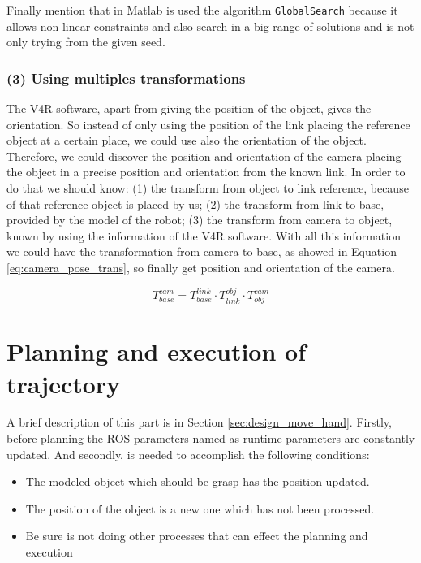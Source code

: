 \documentclass[12pt,a4paper,final,twoside,openright]{report}
\begin{document}
Finally mention that in Matlab is used the algorithm \texttt{GlobalSearch} because it allows non-linear constraints and also search in a big range of solutions and is not only trying from the given seed. 

\vspace{-10pt}
\subsubsection{(3) Using multiples transformations}

The V4R software, apart from giving the position of the object, gives the orientation. So instead of only using the position of the link placing the reference object at a certain place, we could use also the orientation of the object. Therefore, we could discover the position and orientation of the camera placing the object in a precise position and orientation from the known link. In order to do that we should know: (1) the transform from object to link reference, because of that reference object is placed by us; (2) the transform from link to base, provided by the model of the robot; (3) the transform from camera to object, known by using the information of the V4R software. With all this information we could have the transformation from camera to base, as showed in Equation \eqref{eq:camera_pose_trans}, so finally get position and orientation of the camera.

\begin{equation}\label{eq:camera_pose_trans}
T_{base}^{cam} = T_{base}^{link} \cdot T_{link}^{obj} \cdot T_{obj}^{cam}
\end{equation} 

\section{Planning and execution of trajectory}

A brief description of this part is in Section \ref{sec:design_move_hand}. Firstly, before planning the ROS parameters named as runtime parameters are constantly updated. And secondly, is needed to accomplish the following conditions:

\begin{itemize}
\item The modeled object which should be grasp has the position updated.
\item The position of the object is a new one which has not been processed.
\item Be sure is not doing other processes that can effect the planning and execution
\end{itemize}
\end{document}
